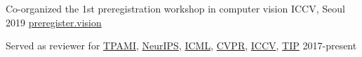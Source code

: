 \begin{cvreferee}
  \cvtalk
    {} %
    {Co-organized the 1st preregistration workshop in computer vision} %
    {ICCV, Seoul} %
    {2019} %
  \cvtalkinfo
    {\href{http://preregister.vision}{preregister.vision}}
    {} %
    {} %

   \cvtalk
    {} %
    {Served as reviewer for \href{https://www.computer.org/web/tpami}{TPAMI}, \href{http://nips.cc}{NeurIPS}, \href{http://icml.cc}{ICML}, \href{http://cvpr2018.thecvf.com}{CVPR}, \href{http://iccv2017.thecvf.com}{ICCV}, \href{http://ieeexplore.ieee.org/xpl/RecentIssue.jsp?punumber=83}{TIP}} %
    {} %
    {2017-present} %


\end{cvreferee}
